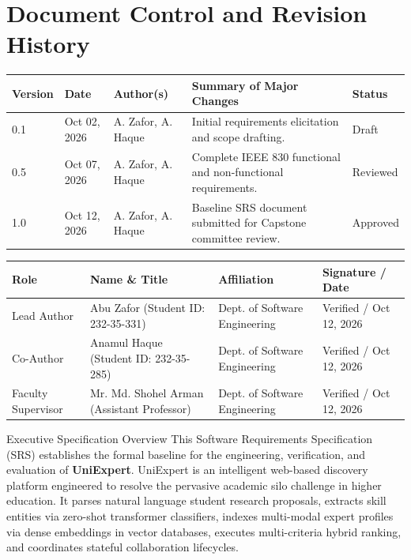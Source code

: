 \documentclass[11pt,a4paper]{article}
\begin{document}
\thispagestyle{plain}
\section*{Document Control and Revision History}

\begin{table}[H]
\centering
\small
\begin{tabularx}{\textwidth}{@{}l l l X l@{}}
\toprule
\textbf{Version} & \textbf{Date} & \textbf{Author(s)} & \textbf{Summary of Major Changes} & \textbf{Status} \\
\midrule
0.1 & Oct 02, 2026 & A. Zafor, A. Haque & Initial requirements elicitation and scope drafting. & Draft \\
0.5 & Oct 07, 2026 & A. Zafor, A. Haque & Complete IEEE 830 functional and non-functional requirements. & Reviewed \\
1.0 & Oct 12, 2026 & A. Zafor, A. Haque & Baseline SRS document submitted for Capstone committee review. & Approved \\
\bottomrule
\end{tabularx}
\end{table}

\vspace{0.6cm}
\begin{table}[H]
\centering
\small
\begin{tabularx}{\textwidth}{@{}l X l l@{}}
\toprule
\textbf{Role} & \textbf{Name \& Title} & \textbf{Affiliation} & \textbf{Signature / Date} \\
\midrule
Lead Author & Abu Zafor (Student ID: 232-35-331) & Dept. of Software Engineering & Verified / Oct 12, 2026 \\
Co-Author & Anamul Haque (Student ID: 232-35-285) & Dept. of Software Engineering & Verified / Oct 12, 2026 \\
Faculty Supervisor & Mr. Md. Shohel Arman (Assistant Professor) & Dept. of Software Engineering & Verified / Oct 12, 2026 \\
\bottomrule
\end{tabularx}
\end{table}

\vspace{0.8cm}
\begin{calloutbox}{Executive Specification Overview}
This Software Requirements Specification (SRS) establishes the formal baseline for the engineering, verification, and evaluation of \textbf{UniExpert}. UniExpert is an intelligent web-based discovery platform engineered to resolve the pervasive academic silo challenge in higher education. It parses natural language student research proposals, extracts skill entities via zero-shot transformer classifiers, indexes multi-modal expert profiles via dense embeddings in vector databases, executes multi-criteria hybrid ranking, and coordinates stateful collaboration lifecycles.
\end{calloutbox}
\end{document}
